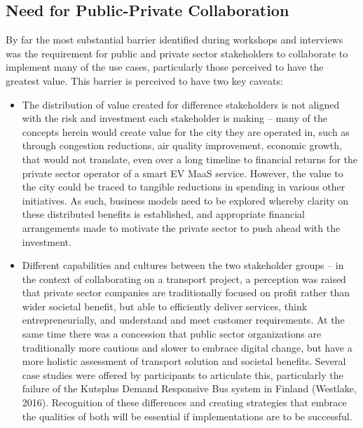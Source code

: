\documentclass[journal]{IEEEtran}
\begin{document}
\subsection{Need for Public-Private Collaboration}

By far the most substantial barrier identified during workshops and
interviews was the requirement for public and private sector
stakeholders to collaborate to implement many of the use cases,
particularly those perceived to have the greatest value. This barrier
is perceived to have two key caveats:

\begin{itemize}
\item The distribution of value created for difference stakeholders is
  not aligned with the risk and investment each stakeholder is making
  – many of the concepts herein would create value for the city they
  are operated in, such as through congestion reductions, air quality
  improvement, economic growth, that would not translate, even over a
  long timeline to financial returns for the private sector operator
  of a smart EV MaaS service. However, the value to the city could be
  traced to tangible reductions in spending in various other
  initiatives. As such, business models need to be explored whereby
  clarity on these distributed benefits is established, and
  appropriate financial arrangements made to motivate the private
  sector to push ahead with the investment.
\item Different capabilities and cultures between the two stakeholder
  groups – in the context of collaborating on a transport project, a
  perception was raised that private sector companies are
  traditionally focused on profit rather than wider societal benefit,
  but able to efficiently deliver services, think entrepreneurially,
  and understand and meet customer requirements. At the same time
  there was a concession that public sector organizations are
  traditionally more cautious and slower to embrace digital change,
  but have a more holistic assessment of transport solution and
  societal benefits. Several case studies were offered by participants
  to articulate this, particularly the failure of the Kutsplus Demand
  Responsive Bus system in Finland (Westlake, 2016). Recognition of
  these differences and creating strategies that embrace the qualities
  of both will be essential if implementations are to be successful. 
\end{itemize}
\end{document}
